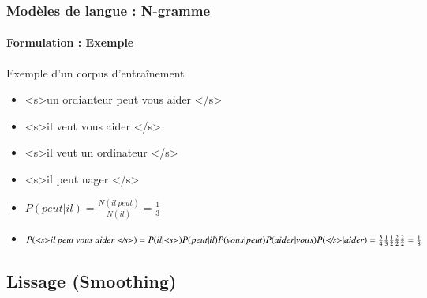 \documentclass[xcolor=table]{beamer}
\begin{document}
\begin{frame}
\frametitle{Modèles de langue : N-gramme}
\framesubtitle{Formulation : Exemple}

\begin{exampleblock}{Exemple d'un corpus d'entraînement}
	\begin{itemize}
		\item \textless s\textgreater un ordianteur peut vous aider \textless/s\textgreater
		\item \textless s\textgreater il veut vous aider \textless/s\textgreater
		\item \textless s\textgreater il veut un ordinateur \textless/s\textgreater
		\item \textless s\textgreater il peut nager \textless/s\textgreater
	\end{itemize}
\end{exampleblock}

\begin{itemize}
	\item $P(peut | il) = \frac{N(il\ peut)}{N(il)} = \frac{1}{3}$
	\item $P(\text{\textit{\textless s\textgreater il peut vous aider \textless/s\textgreater}}) = 
	P(il|\text{\textit{\textless s\textgreater}}) P(peut|il) P(vous|peut) P(aider|vous) P(\text{\textit{\textless/s\textgreater}}|aider) = 
	\frac{3}{4} \frac{1}{3} \frac{1}{2} \frac{2}{2} \frac{2}{2} = \frac{1}{8}
	$
\end{itemize}


\end{frame}

\subsection{Lissage (Smoothing)}
\end{document}
